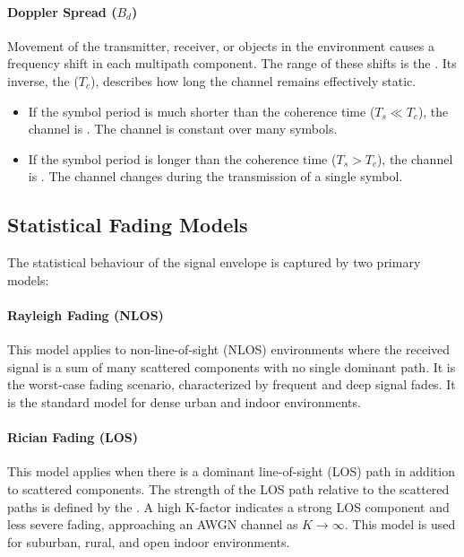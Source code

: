 \paragraph{Doppler Spread ($B_d$)}
Movement of the transmitter, receiver, or objects in the environment causes a frequency shift in each multipath component. The range of these shifts is the . Its inverse, the  ($T_c$), describes how long the channel remains effectively static.
\begin{itemize}
    \item If the symbol period is much shorter than the coherence time ($T_s \ll T_c$), the channel is . The channel is constant over many symbols.
    \item If the symbol period is longer than the coherence time ($T_s > T_c$), the channel is . The channel changes during the transmission of a single symbol.
\end{itemize}


\subsection{Statistical Fading Models}

The statistical behaviour of the signal envelope is captured by two primary models:

\paragraph{Rayleigh Fading (NLOS)}
This model applies to non-line-of-sight (NLOS) environments where the received signal is a sum of many scattered components with no single dominant path. It is the worst-case fading scenario, characterized by frequent and deep signal fades. It is the standard model for dense urban and indoor environments.

\paragraph{Rician Fading (LOS)}
This model applies when there is a dominant line-of-sight (LOS) path in addition to scattered components. The strength of the LOS path relative to the scattered paths is defined by the . A high K-factor indicates a strong LOS component and less severe fading, approaching an AWGN channel as $K \to \infty$. This model is used for suburban, rural, and open indoor environments.


